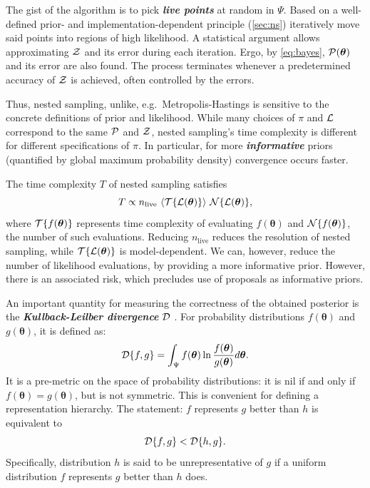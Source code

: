 \documentclass[usenatbib]{mnras}
\begin{document}
The gist of the algorithm \citep{Skilling2006} is to pick \textbf{\emph{live
  points}} at random in $\Psi$. Based on a well-defined prior- and
implementation-dependent principle (\cref{sec:ns}) iteratively move
said points into regions of high likelihood. A statistical argument
allows approximating ${\cal Z}$ and its error during each
iteration. Ergo, by \cref{eq:bayes}, ${\cal P}(\bm{\theta})$ and its
error are also found. The process terminates whenever a predetermined
accuracy of ${\cal Z}$ is achieved, often controlled by the errors.

Thus, nested sampling, unlike, e.g.~Metropolis-Hastings
\cite{Metropolis-Hastings-Gibbs} is sensitive to the concrete
definitions of prior and likelihood. While many choices of $\pi$ and
${\cal L}$ correspond to the same ${\cal P}$ and ${\cal Z}$, nested
sampling's time complexity is different for different specifications
of $\pi$\citep{Skilling2006}. In particular, for more
\textbf{\emph{informative}} priors (quantified by global maximum probability
density) convergence occurs faster.

The time complexity $T$ of nested sampling satisfies
\begin{equation}\label{eq:complexity}
  T \propto  n_\text{live}\  \langle {\cal T}\{{\cal L}(\bm{\theta})\} \rangle \ {\cal N}\{{\cal L}(\bm{\theta}) \},
\end{equation}
where ${\cal T}\{f(\bm{\theta})\}$ represents time complexity of
evaluating $f(\bm{\theta})$ and ${\cal N}\{f(\bm{\theta})\}$, the
number of such evaluations. Reducing $n_\text{live}$ reduces the
resolution of nested sampling, while
$ {\cal T}\{{\cal L}(\bm{\theta})\}$ is model-dependent. We can,
however, reduce the number of likelihood evaluations, by providing a
more informative prior. However, there is an associated risk, which
precludes use of proposals as informative priors.

An important quantity for measuring the correctness of the obtained
posterior is the \textbf{\emph{Kullback-Leilber divergence}} ${\cal D}$
\citep{Kullback_1951}. For probability distributions
\(f(\bm{\theta})\) and \(g(\bm{\theta})\), it is defined as:
\begin{equation}
  \label{eq:kl-def}
  {\cal D}\{f, g \} = \int_{\Psi}f(\bm{\theta}) \ln \frac{f(\bm{\theta})}{g(\bm{\theta})} d \bm{\theta}.
\end{equation}
It is a pre-metric on the space of probability distributions: it is
nil if and only if $f(\bm{\theta}) = g(\bm{\theta})$, but is not
symmetric. This is convenient for defining a representation
hierarchy. The statement: $f$ represents $g$ better than $h$ is
equivalent to
\begin{equation}
  \label{eq:hierarchy}
  {\cal D}\{f, g\} < {\cal D}\{h, g\}.
\end{equation}
Specifically, distribution $h$ is said to be unrepresentative of $g$
if a uniform distribution $f$ represents $g$ better than $h$ does.
\end{document}
